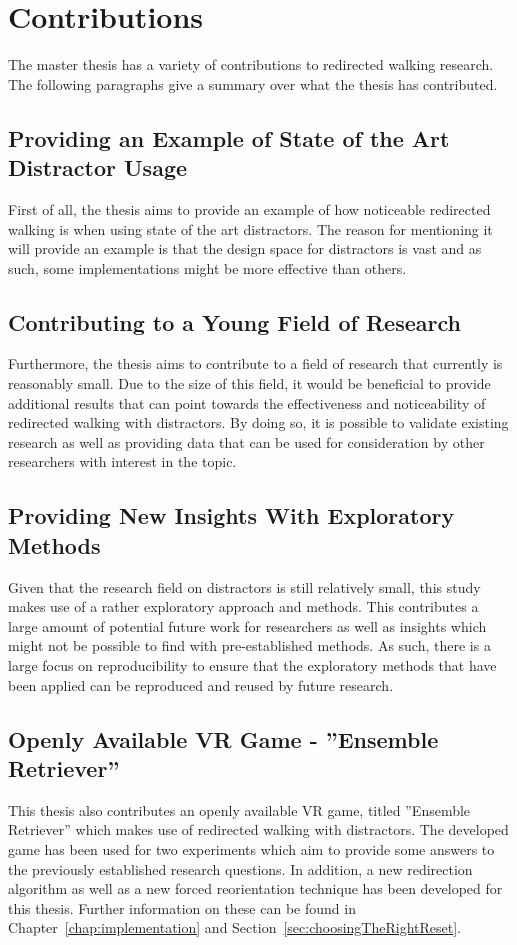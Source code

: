 \section{Contributions}
The master thesis has a variety of contributions to redirected walking research. The following paragraphs give a summary over what the thesis has contributed.

\subsection{Providing an Example of State of the Art Distractor Usage}
First of all, the thesis aims to provide an example of how noticeable redirected walking is when using state of the art distractors. The reason for mentioning it will provide an example is that the design space for distractors is vast and as such, some implementations might be more effective than others. 

\subsection{Contributing to a Young Field of Research}
Furthermore, the thesis aims to contribute to a field of research that currently is reasonably small. Due to the size of this field, it would be beneficial to provide additional results that can point towards the effectiveness and noticeability of redirected walking with distractors. By doing so, it is possible to validate existing research as well as providing data that can be used for consideration by other researchers with interest in the topic. 

\subsection{Providing New Insights With Exploratory Methods}
Given that the research field on distractors is still relatively small, this study makes use of a rather exploratory approach and methods. This contributes a large amount of potential future work for researchers as well as insights which might not be possible to find with pre-established methods. As such, there is a large focus on reproducibility to ensure that the exploratory methods that have been applied can be reproduced and reused by future research. 

\subsection{Openly Available VR Game - ''Ensemble Retriever''}
This thesis also contributes an openly available VR game, titled ''Ensemble Retriever'' which makes use of redirected walking with distractors. The developed game has been used for two experiments which aim to provide some answers to the previously established research questions. In addition, a new redirection algorithm as well as a new forced reorientation technique has been developed for this thesis. Further information on these can be found in Chapter~\ref{chap:implementation} and Section~\ref{sec:choosingTheRightReset}. 

